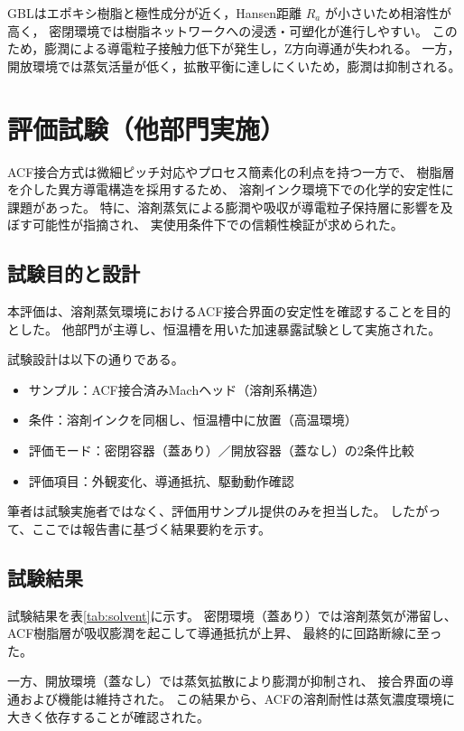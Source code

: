 \documentclass[conference]{IEEEtran}
\begin{document}
GBLはエポキシ樹脂と極性成分が近く，Hansen距離 $R_a$ が小さいため相溶性が高く，
密閉環境では樹脂ネットワークへの浸透・可塑化が進行しやすい。
このため，膨潤による導電粒子接触力低下が発生し，Z方向導通が失われる。
一方，開放環境では蒸気活量が低く，拡散平衡に達しにくいため，膨潤は抑制される。

\section{評価試験（他部門実施）}

ACF接合方式は微細ピッチ対応やプロセス簡素化の利点を持つ一方で、  
樹脂層を介した異方導電構造を採用するため、  
溶剤インク環境下での化学的安定性に課題があった。  
特に、溶剤蒸気による膨潤や吸収が導電粒子保持層に影響を及ぼす可能性が指摘され、  
実使用条件下での信頼性検証が求められた。

\subsection{試験目的と設計}
本評価は、溶剤蒸気環境におけるACF接合界面の安定性を確認することを目的とした。  
他部門が主導し、恒温槽を用いた加速暴露試験として実施された。  

試験設計は以下の通りである。

\begin{itemize}
  \item サンプル：ACF接合済みMachヘッド（溶剤系構造）
  \item 条件：溶剤インクを同梱し、恒温槽中に放置（高温環境）
  \item 評価モード：密閉容器（蓋あり）／開放容器（蓋なし）の2条件比較
  \item 評価項目：外観変化、導通抵抗、駆動動作確認
\end{itemize}

筆者は試験実施者ではなく、評価用サンプル提供のみを担当した。  
したがって、ここでは報告書に基づく結果要約を示す。

\subsection{試験結果}
試験結果を表\ref{tab:solvent}に示す。  
密閉環境（蓋あり）では溶剤蒸気が滞留し、  
ACF樹脂層が吸収膨潤を起こして導通抵抗が上昇、  
最終的に回路断線に至った。  

一方、開放環境（蓋なし）では蒸気拡散により膨潤が抑制され、  
接合界面の導通および機能は維持された。  
この結果から、ACFの溶剤耐性は蒸気濃度環境に大きく依存することが確認された。
\end{document}
